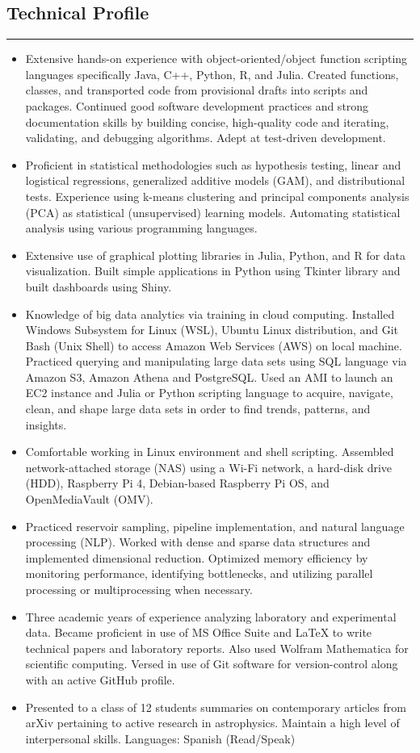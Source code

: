 \documentclass[letterpaper, 10 pt]{article}
\begin{document}
\subsection*{Technical Profile}
\noindent\rule[0.75ex]{\linewidth}{0.55 pt}
\begin{itemize}
\setlength\itemsep{0.10 em}
\item Extensive hands-on experience with object-oriented/object function scripting languages specifically Java, C++, Python, R, and Julia. Created functions, classes, and transported code from provisional drafts into scripts and packages. Continued good software development practices and strong documentation skills by building concise, high-quality code and iterating, validating, and debugging algorithms. Adept at test-driven development.
\item Proficient in statistical methodologies such as hypothesis testing, linear and logistical regressions, generalized additive models (GAM), and distributional tests. Experience using k-means clustering and principal components analysis (PCA) as statistical (unsupervised) learning models. Automating statistical analysis using various programming languages.
\item Extensive use of graphical plotting libraries in Julia, Python, and R for data visualization. Built simple applications in Python using Tkinter library and built dashboards using Shiny.
\item Knowledge of big data analytics via training in cloud computing. Installed Windows Subsystem for Linux (WSL), Ubuntu Linux distribution, and Git Bash (Unix Shell) to access Amazon Web Services (AWS) on local machine. Practiced querying and manipulating large data sets using SQL language via Amazon S3, Amazon Athena and PostgreSQL. Used an AMI to launch an EC2 instance and Julia or Python scripting language to acquire, navigate, clean, and shape large data sets in order to find trends, patterns, and insights. 
\item Comfortable working in Linux environment and shell scripting. Assembled network-attached storage (NAS) using a Wi-Fi network, a hard-disk drive (HDD), Raspberry Pi 4, Debian-based Raspberry Pi OS, and OpenMediaVault (OMV).
\item Practiced reservoir sampling, pipeline implementation, and natural language processing (NLP). Worked with dense and sparse data structures and implemented dimensional reduction. Optimized memory efficiency by monitoring performance, identifying bottlenecks, and utilizing parallel processing or multiprocessing when necessary.
\item Three academic years of experience analyzing laboratory and experimental data. Became proficient in use of MS Office Suite and LaTeX to write technical papers and laboratory reports. Also used Wolfram Mathematica for scientific computing. Versed in use of Git software for version-control along with an active GitHub profile.
\item Presented to a class of 12 students summaries on contemporary articles from arXiv pertaining to active research in astrophysics. Maintain a high level of interpersonal skills. Languages: Spanish (Read/Speak)
\end{itemize}
\end{document}
